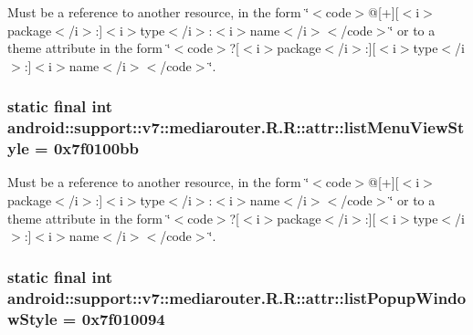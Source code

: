 Must be a reference to another resource, in the form \char`\"{}$<$code$>$@\mbox{[}+\mbox{]}\mbox{[}$<$i$>$package$<$/i$>$:\mbox{]}$<$i$>$type$<$/i$>$:$<$i$>$name$<$/i$>$$<$/code$>$\char`\"{} or to a theme attribute in the form \char`\"{}$<$code$>$?\mbox{[}$<$i$>$package$<$/i$>$:\mbox{]}\mbox{[}$<$i$>$type$<$/i$>$:\mbox{]}$<$i$>$name$<$/i$>$$<$/code$>$\char`\"{}. \hypertarget{classandroid_1_1support_1_1v7_1_1mediarouter_1_1_r_1_1attr_49069b667a24a30d45fa625669a722d0}{
\subsubsection[{listMenuViewStyle}]{\setlength{\rightskip}{0pt plus 5cm}static final int android::support::v7::mediarouter.R.R::attr::listMenuViewStyle = 0x7f0100bb}}
\label{classandroid_1_1support_1_1v7_1_1mediarouter_1_1_r_1_1attr_49069b667a24a30d45fa625669a722d0}


Must be a reference to another resource, in the form \char`\"{}$<$code$>$@\mbox{[}+\mbox{]}\mbox{[}$<$i$>$package$<$/i$>$:\mbox{]}$<$i$>$type$<$/i$>$:$<$i$>$name$<$/i$>$$<$/code$>$\char`\"{} or to a theme attribute in the form \char`\"{}$<$code$>$?\mbox{[}$<$i$>$package$<$/i$>$:\mbox{]}\mbox{[}$<$i$>$type$<$/i$>$:\mbox{]}$<$i$>$name$<$/i$>$$<$/code$>$\char`\"{}. \hypertarget{classandroid_1_1support_1_1v7_1_1mediarouter_1_1_r_1_1attr_b7fc037f5ce6f089aaeedd6d6b7236bf}{
\subsubsection[{listPopupWindowStyle}]{\setlength{\rightskip}{0pt plus 5cm}static final int android::support::v7::mediarouter.R.R::attr::listPopupWindowStyle = 0x7f010094}}
\label{classandroid_1_1support_1_1v7_1_1mediarouter_1_1_r_1_1attr_b7fc037f5ce6f089aaeedd6d6b7236bf}


